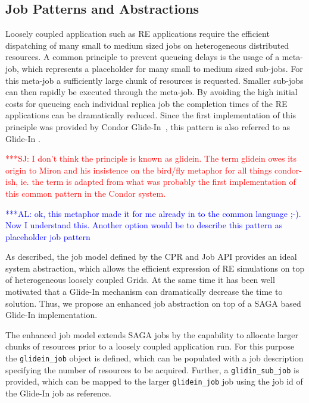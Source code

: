 \documentclass{rspublic}
\newcommand{\alnote}[1]{ {\textcolor{blue} { ***AL: #1 }}}
\newcommand{\jhanote}[1]{ {\textcolor{red} { ***SJ: #1 }}}
\newcommand{\alnote}[1]{}
\newcommand{\jhanote}[1]{}
\newcommand{\glidein}[1]{Glide-In }
\begin{document}
\subsection{Job Patterns and Abstractions} 



Loosely coupled application such as RE applications require the efficient
dispatching of many small to medium sized jobs on heterogeneous distributed resources.
A common principle to prevent queueing delays is the usage of a meta-job, which
represents a placeholder for many small to medium sized sub-jobs. For this meta-job a
sufficiently large chunk of resources is requested. Smaller sub-jobs can then rapidly 
be executed through the meta-job.
By avoiding the high initial costs for queueing each individual 
replica job the completion times of the RE applications can be dramatically
reduced. Since the first implementation of this principle was provided by Condor 
Glide-In~\citep{citeulike:291860}, this pattern is also referred to as \glidein\ .

\jhanote{I
don't think the principle is known as glidein. The term glidein owes
its origin to Miron and his insistence on the bird/fly metaphor for
all things condor-ish, ie. the term is adapted from what was
probably the first implementation of this common pattern in the
Condor system.}             

\alnote{ok, this metaphor made it for me already in to the common language 
;-). Now I understand this. Another option would 
be to describe this pattern as 
placeholder job pattern}

As described, the job model defined by the CPR and Job API provides an ideal 
system abstraction, which allows the efficient expression of RE simulations on
top of heterogeneous loosely coupled Grids. At the same time it has been well motivated
that a \glidein\ mechanism can dramatically decrease the time to solution. Thus, we
propose an enhanced job abstraction on top of a SAGA based \glidein\ implementation.

The enhanced job model extends SAGA jobs by the
capability to allocate larger chunks of resources prior to a loosely
coupled application run. For this purpose the \texttt{glidein\_job} object is defined, which
can be populated with a job description specifying the number of resources to be acquired.
Further, a \texttt{glidin\_sub\_job} is provided, which can be mapped
to the larger \texttt{glidein\_job} job using the job id of the \glidein\ job as reference.
\end{document}
